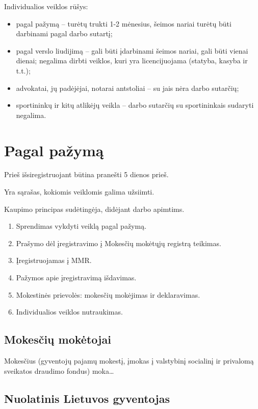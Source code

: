 Individualios veiklos rūšys:
\begin{itemize}
  \item pagal pažymą – turėtų trukti 1-2 mėnesius, šeimos nariai turėtų
    būti darbinami pagal darbo sutartį;
  \item pagal verslo liudijimą – gali būti įdarbinami šeimos nariai,
    gali būti vienai dienai; negalima dirbti veiklos, kuri yra 
    licencijuojama (statyba, kasyba ir t.t.);
  \item advokatai, jų padėjėjai, notarai antstoliai – su jais nėra darbo
    sutarčių;
  \item sportininkų ir kitų atlikėjų veikla – darbo sutarčių su
    sportininkais sudaryti negalima.
\end{itemize}

\section{Pagal pažymą}

Prieš išsiregistruojant būtina pranešti 5 dienos prieš.

Yra sąrašas, kokiomis veiklomis galima užsiimti.

Kaupimo principas sudėtingėja, didėjant darbo apimtims.

\begin{enumerate}
  \item Sprendimas vykdyti veiklą pagal pažymą.
  \item Prašymo dėl įregistravimo į Mokesčių mokėtųjų registrą teikimas.
  \item Įregistruojamas į MMR.
  \item Pažymos apie įregistravimą išdavimas.
  \item Mokestinės prievolės: mokesčių mokėjimas ir deklaravimas.
  \item Individualios veiklos nutraukimas.
\end{enumerate}

\subsection{Mokesčių mokėtojai}

Mokesčius (gyventojų pajamų mokestį, įmokas į valstybinį socialinį ir
privalomą sveikatos draudimo fondus) moka…

\subsection{Nuolatinis Lietuvos gyventojas}

